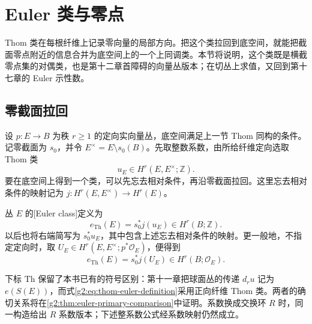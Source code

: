 
% 
% 

\section{Euler 类与零点}
\label{g2:sec:2003}

Thom 类在每根纤维上记录零向量的局部方向。把这个类拉回到底空间，就能把截面零点附近的信息合并为底空间上的一个上同调类。本节将说明，这个类既是横截零点集的对偶类，也是第十二章首障碍的向量丛版本；在切丛上求值，又回到第十七章的 Euler 示性数。

\subsection{零截面拉回}
\label{g2:subsec:2003:01}
设 \(p:E\to B\) 为秩 \(r\ge1\) 的定向实向量丛，底空间满足上一节 Thom 同构的条件。记零截面为 \(s_0\)，并令 \(E^\times=E\setminus s_0(B)\)。先取整数系数，由所给纤维定向选取 Thom 类
\[
	u_E\in H^r(E,E^\times;\mathbb Z).
\]
要在底空间上得到一个类，可以先忘去相对条件，再沿零截面拉回。这里忘去相对条件的映射记为 \(j:H^r(E,E^\times)\to H^r(E)\)。

\begin{definition}\label{g2:def:thom-euler-class}
	丛 \(E\) 的[Euler class]定义为
	\begin{equation}\label{g2:eq:thom-euler-definition}
		e_{\mathrm{Th}}(E)=s_0^*j(u_E)\in H^r(B;\mathbb Z).
	\end{equation}
	以后也将右端简写为 \(s_0^*u_E\)，其中包含上述忘去相对条件的映射。更一般地，不指定定向时，取 \(U_E\in H^r(E,E^\times;p^*\mathcal O_E)\)，便得到
	\[
		e_{\mathrm{Th}}(E)=s_0^*j(U_E)\in H^r(B;\mathcal O_E).
	\]
\end{definition}

下标 \(\mathrm{Th}\) 保留了本书已有的符号区别：第十一章把球面丛的传递 \(d_ru\) 记为 \(e(S(E))\)，而式\eqref{g2:eq:thom-euler-definition}采用正向纤维 Thom 类。两者的确切关系将在\cref{g2:thm:euler-primary-comparison}中证明。系数换成交换环 \(R\) 时，同一构造给出 \(R\) 系数版本；下述整系数公式经系数映射仍然成立。

